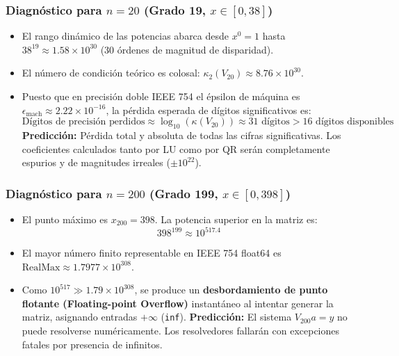 \documentclass[11pt,a4paper]{article}
\theoremstyle{definition}
\theoremstyle{remark}
\begin{document}
\subsubsection{Diagnóstico para $n = 20$ (Grado 19, $x \in [0, 38]$)}
\begin{itemize}[leftmargin=*]
    \item El rango dinámico de las potencias abarca desde $x^0 = 1$ hasta $38^{19} \approx 1.58 \times 10^{30}$ (30 órdenes de magnitud de disparidad).
    \item El número de condición teórico es colosal: $\kappa_2(V_{20}) \approx 8.76 \times 10^{30}$.
    \item Puesto que en precisión doble IEEE 754 el épsilon de máquina es $\epsilon_{\text{mach}} \approx 2.22 \times 10^{-16}$, la pérdida esperada de dígitos significativos es:
    \begin{equation}
        \text{Dígitos de precisión perdidos} \approx \log_{10}(\kappa(V_{20})) \approx 31 \text{ dígitos} > 16 \text{ dígitos disponibles}
    \end{equation}
    \textbf{Predicción:} Pérdida total y absoluta de todas las cifras significativas. Los coeficientes calculados tanto por LU como por QR serán completamente espurios y de magnitudes irreales ($\pm 10^{22}$).
\end{itemize}

\subsubsection{Diagnóstico para $n = 200$ (Grado 199, $x \in [0, 398]$)}
\begin{itemize}[leftmargin=*]
    \item El punto máximo es $x_{200} = 398$. La potencia superior en la matriz es:
    \begin{equation}
        398^{199} \approx 10^{517.4}
    \end{equation}
    \item El mayor número finito representable en IEEE 754 float64 es $\text{RealMax} \approx 1.7977 \times 10^{308}$.
    \item Como $10^{517} \gg 1.79 \times 10^{308}$, se produce un \textbf{desbordamiento de punto flotante (Floating-point Overflow)} instantáneo al intentar generar la matriz, asignando entradas $+\infty$ (\texttt{inf}).
    \textbf{Predicción:} El sistema $V_{200} a = y$ no puede resolverse numéricamente. Los resolvedores fallarán con excepciones fatales por presencia de infinitos.
\end{itemize}
\end{document}
